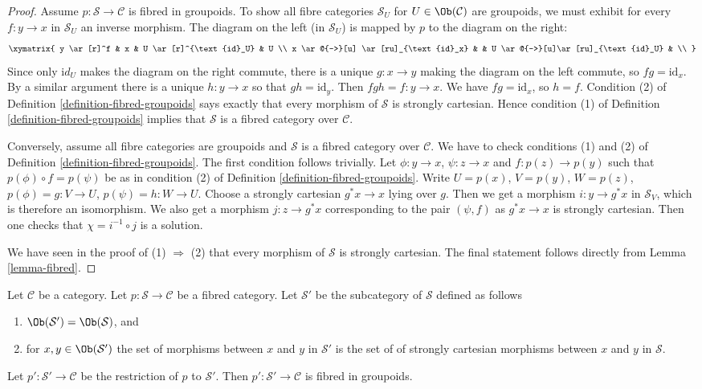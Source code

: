 \begin{proof}
Assume $p : \mathcal{S} \to \mathcal{C}$ is fibred in groupoids.
To show all fibre categories $\mathcal{S}_U$ for
$U \in \Ob(\mathcal{C})$
are groupoids, we must exhibit for every $f : y \to x$ in $\mathcal{S}_U$ an
inverse morphism.  The diagram on the left (in $\mathcal{S}_U$) is mapped by
$p$ to the diagram on the right:
$$
\xymatrix{
y \ar[r]^f & x & U \ar[r]^{\text{id}_U} & U \\
x \ar@{-->}[u] \ar[ru]_{\text{id}_x} & &
U \ar@{-->}[u]\ar[ru]_{\text{id}_U} & \\
}
$$
Since only $\text{i}d_U$ makes the diagram on the right commute, there is a
unique $g : x \to y$ making the diagram on the left commute, so
$fg = \text{id}_x$. By a similar argument there is a unique $h : y \to x$ so
that $gh = \text{id}_y$. Then $fgh = f : y \to x$.  We have $fg = \text{id}_x$,
so $h = f$. Condition (2) of Definition \ref{definition-fibred-groupoids} says
exactly that every morphism of $\mathcal{S}$ is strongly cartesian. Hence
condition (1) of Definition \ref{definition-fibred-groupoids} implies that
$\mathcal{S}$ is a fibred category over $\mathcal{C}$.

\medskip\noindent
Conversely, assume all fibre categories are groupoids and
$\mathcal{S}$ is a fibred category over $\mathcal{C}$.
We have to check conditions (1) and (2) of
Definition \ref{definition-fibred-groupoids}.
The first condition follows trivially. Let $\phi : y \to x$,
$\psi : z \to x$ and $f : p(z) \to p(y)$ such that
$p(\phi) \circ f = p(\psi)$ be as in condition (2) of
Definition \ref{definition-fibred-groupoids}.
Write $U = p(x)$, $V = p(y)$, $W = p(z)$, $p(\phi) = g : V \to U$,
$p(\psi) = h : W \to U$. Choose a strongly cartesian $g^*x \to x$
lying over $g$. Then we get a morphism $i : y \to g^*x$ in
$\mathcal{S}_V$, which is therefore an isomorphism. We
also get a morphism $j : z \to g^*x$ corresponding to
the pair $(\psi, f)$ as $g^*x \to x$ is strongly cartesian.
Then one checks that $\chi = i^{-1} \circ j$ is a solution.

\medskip\noindent
We have seen in the proof of (1) $\Rightarrow$ (2) that
every morphism of $\mathcal{S}$ is strongly cartesian.
The final statement follows directly from Lemma \ref{lemma-fibred}.
\end{proof}

\begin{lemma}
\label{lemma-fibred-gives-fibred-groupoids}
Let $\mathcal{C}$ be a category.
Let $p : \mathcal{S} \to \mathcal{C}$ be a fibred category.
Let $\mathcal{S}'$ be the subcategory of $\mathcal{S}$ defined
as follows
\begin{enumerate}
\item $\Ob(\mathcal{S}') = \Ob(\mathcal{S})$, and
\item for $x, y \in \Ob(\mathcal{S}')$ the set of morphisms between $x$
and $y$ in $\mathcal{S}'$ is the set of of strongly cartesian morphisms between
$x$ and $y$ in $\mathcal{S}$.
\end{enumerate}
Let $p' : \mathcal{S}' \to \mathcal{C}$ be the restriction of $p$
to $\mathcal{S}'$. Then $p' : \mathcal{S}' \to \mathcal{C}$ is fibred
in groupoids.
\end{lemma}

